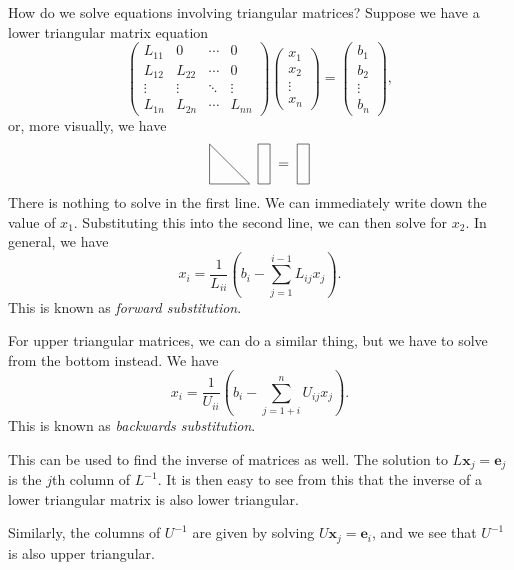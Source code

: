 \documentclass[a4paper]{article}
\begin{document}
How do we solve equations involving triangular matrices? Suppose we have a lower triangular matrix equation
\[
  \begin{pmatrix}
    L_{11} & 0 & \cdots & 0\\
    L_{12} & L_{22} & \cdots & 0\\
    \vdots & \vdots & \ddots & \vdots\\
    L_{1n} & L_{2n} & \cdots & L_{nn}
  \end{pmatrix}
  \begin{pmatrix}
    x_1\\
    x_2\\
    \vdots\\
    x_n
  \end{pmatrix}
  =
  \begin{pmatrix}
    b_1\\
    b_2\\
    \vdots\\
    b_n
  \end{pmatrix},
\]
or, more visually, we have
\[
  \begin{tikzpicture}[baseline=-0.65ex]
    \draw (0, -0.5) -- (1, -0.5) -- (0, 0.5) -- cycle;
  \end{tikzpicture}
  \;\;
  \begin{tikzpicture}[baseline=-0.65ex]
    \draw (0, -0.5) rectangle (0.3, 0.5);
  \end{tikzpicture}
  \;
  =
  \;
  \begin{tikzpicture}[baseline=-0.65ex]
    \draw (0, -0.5) rectangle (0.3, 0.5);
  \end{tikzpicture}
\]
There is nothing to solve in the first line. We can immediately write down the value of $x_1$. Substituting this into the second line, we can then solve for $x_2$. In general, we have
\[
  x_i = \frac{1}{L_{ii}} \left(b_i - \sum_{j = 1}^{i - 1} L_{ij} x_j\right).
\]
This is known as \emph{forward substitution}.

For upper triangular matrices, we can do a similar thing, but we have to solve from the bottom instead. We have
\[
  x_i = \frac{1}{U_{ii}} \left(b_i - \sum_{j = 1 + i}^n U_{ij} x_j\right).
\]
This is known as \emph{backwards substitution}.

This can be used to find the inverse of matrices as well. The solution to $L \mathbf{x}_j = \mathbf{e}_j$ is the $j$th column of $L^{-1}$. It is then easy to see from this that the inverse of a lower triangular matrix is also lower triangular.

Similarly, the columns of $U^{-1}$ are given by solving $U\mathbf{x}_j = \mathbf{e}_i$, and we see that $U^{-1}$ is also upper triangular.
\end{document}
